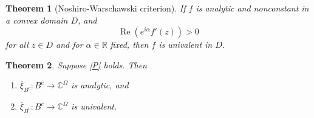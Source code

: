 \documentclass[10pt,a4paper]{amsart}
\numberwithin{equation}{section}
\newtheorem{theorem}{Theorem}[section]
\begin{document}
\begin{theorem}[Noshiro-Warschawski criterion]
If $f$ is analytic and nonconstant in a convex domain $D$, and
$$
\operatorname{Re}(e^{i \alpha} f'(z))>0
$$
for all $z \in D$ and for $\alpha \in \mathbb{R}$ fixed, then $f$ is univalent in $D$.
\end{theorem}

\begin{theorem}
\label{thm:analytic}
Suppose \eqref{P} holds. Then
\begin{enumerate}
 \item $\overline{\xi}_{B^c}:B^c \to \mathbb{C}^{\Omega}$ is analytic, and
 \item $\overline{\xi}_{B^c}:B^c \to \mathbb{C}^{\Omega}$ is univalent.
\end{enumerate}
\end{theorem}
\end{document}
